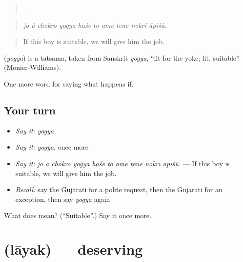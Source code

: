 \begin{quote}
         .
\end{quote}

\begin{quote}
\emph{jo ā chokro yogya haśe to ame tene nokrī āpīśũ.}
\end{quote}

\begin{quote}
If this boy is suitable, we will give him the job.
\end{quote}

\begin{cousinweb}
\textbf{} (\emph{yogya}) is a tatsama, taken from Sanskrit \emph{yogya}, \textquotedblleft{}fit for the yoke; fit, suitable\textquotedblright{} (Monier-Williams).
\end{cousinweb}

\begin{grammarlens}[title={What you've built}]
One more word for saying what happens if.
\end{grammarlens}

\subsection*{Your turn}
\begin{itemize}
\raggedright
  \item \emph{Say it:} \emph{yogya}
  \item \emph{Say it:} \emph{yogya}, once more
  \item \emph{Say it:} \emph{jo ā chokro yogya haśe to ame tene nokrī āpīśũ.} — If this boy is suitable, we will give him the job.
  \item \emph{Recall:} say the Gujarati for a polite request, then the Gujarati for an exception, then say \emph{yogya} again
\end{itemize}

\begin{tcolorbox}[breakable,colback=teal!4,colframe=teal!35!black,title={Before you move on}]
What does  mean? (\textquotedblleft{}Suitable\textquotedblright{}.) Say it once more.
\end{tcolorbox}
\section[\texorpdfstring{\gu{લાયક} (lāyak)}{લાયક (lāyak)}]{ (lāyak) — deserving}

